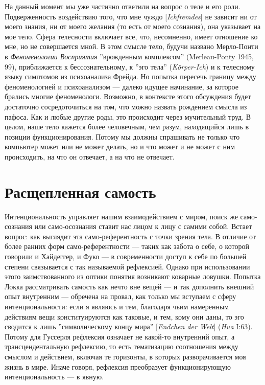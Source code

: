 \documentclass[12pt]{book}
\begin{document}
На данный момент мы уже частично ответили на вопрос о теле и его роли. Подверженность воздействию того, что мне чуждо [\textit{Ichfremdes}] не зависит ни от моего знания, ни от моего желания (то есть от моего сознания), она указывает на мое тело. Сфера телесности включает все, что, несомненно, имеет отношение ко мне, но не совершается мной. В этом смысле тело, будучи названо Мерло-Понти в \textit{Феноменологии Восприятия} ''врожденным комплексом'' (Merleau-Ponty 1945, 99), приближается к бессознательному, к ''эго тела'' (\textit{Körper-Ich}) и к телесному языку симптомов из психоанализа Фрейда. Но попытка пересечь границу между феноменологией и психоанализом --- далеко идущее начинание, за которое брались многие феноменологи. Возможно, в контексте этого обсуждения будет достаточно сосредоточиться на том, что можно назвать рождением смысла из пафоса. Как и любые другие роды, это происходит через мучительный труд. В целом, наше тело кажется более человечным, чем разум, находящийся лишь в позиции функционирования. Потому мы должны спрашивать не только что компьютер может или не может делать, но и что может и не может с ним происходить, на что он отвечает, а на что не отвечает.

\section{Расщепленная самость}

Интенциональность управляет нашим взаимодействием с миром, поиск же само-сознания или само-осознания ставит нас лицом к лицу с самими собой. Встает вопрос: как выглядит эта само-референтность с точки зрения тела. В отличие от более ранних форм само-референтности --- таких как забота о себе, о которой говорили и Хайдеггер, и Фуко --- в современности доступ к себе по большей степени связывается с так называемой рефлексией. Однако при использовании этого заимствованного из оптики понятия возникают коварные ловушки. Попытка Локка рассматривать самость как нечто вне вещей --- и так дополнить внешний опыт внутренним --- обречена на провал, как только мы вступаем с сферу интенциональности: если я являюсь и тем, благодаря чьим намеренным действиям вещи конституируются как таковые, и тем, кому они даны, то эго сводится к лишь ''символическому концу мира'' [\textit{Endchen der Welt}] (\textit{Hua} I:63). Потому для Гуссерля рефлексия означает не какой-то внутренний опыт, а трансцендентальную рефлексию, то есть тематизацию соотношения между смыслом и действием, включая те горизонты, в которых разворачивается моя жизнь в мире. Иначе говоря, рефлексия преобразует функционирующую интенциональность --- в явную.
\end{document}
